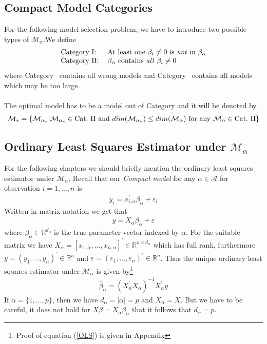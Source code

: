 \documentclass[Research_Module_ES.tex]{subfiles}
\begin{document}
\subsection{Compact Model Categories} \label{chapter_compact_model}
For the following model selection problem, we have to introduce two possible types of $\mathcal{M}_\alpha$.We define
\begin{align*}
\begin{tabular}{ll}
Category~\RM{1}:& At least one $\beta_i\neq 0$ is \textit{not} in $\beta_\alpha$\\
Category~\RM{2}:& $\beta_\alpha$ contains \textit{all} $\beta_i\neq 0$
\end{tabular}
\end{align*}
where Category~ contains all wrong models and Category~ contains all models which may be too large.\\\\
The optimal model has to be a model out of Category  and it will be denoted by
\begin{align*}
\mathcal{M}_\ast=\{\mathcal{M}_{\alpha_\ast}|\mathcal{M}_{\alpha_\ast}\in \text{Cat.~\RM{2}~and~} dim(\mathcal{M}_{\alpha_\ast})\leq dim(\mathcal{M}_{\alpha})\text{~for~any~}\mathcal{M}_{\alpha}\in \text{Cat.~\RM{2}} \}
\end{align*}

\subsection{Ordinary Least Squares Estimator under $\mathcal{M}_\alpha$}
For the following chapters we should briefly mention the ordinary least squares estimator under $\mathcal{M}_\alpha$. Recall that our \textit{Compact model} for any $\alpha\in\mathcal{A}$ for observation $i=1,...,n$ is
\begin{align*}
	y_i=x_{i,\alpha}^\prime\beta_\alpha+\varepsilon_i
\end{align*}
Written in matrix notation we get that
\begin{align}
	y=X_\alpha \beta_\alpha+\varepsilon  \label{CM_model_matrix}
\end{align}
where $\beta_\alpha\in\mathbb{R}^{d_\alpha}$ is the true parameter vector indexed by $\alpha$. For the suitable matrix we have $X_\alpha=[x_{1,\alpha},...,x_{n,\alpha}]^\prime \in\mathbb{R}^{n\times d_\alpha}$
which has full rank, furthermore $y=(y_1,...,y_n)^\prime\in\mathbb{R}^n$ and $\varepsilon=(\varepsilon_1,...,\varepsilon_n)^\prime\in\mathbb{R}^n$. Thus the unique 
ordinary least squares estimator under $\mathcal{M}_\alpha$ is given by\footnote{Proof of equation (\ref{OLS}) is given in Appendix }
\begin{align}
	\hat{\beta}_\alpha=(X_\alpha^\prime X_\alpha)^{-1}X_\alpha^\prime y
	\label{OLS}
\end{align}
If $\alpha=\{1,...,p\}$, then we have $d_\alpha=|\alpha|=p$ and $X_\alpha=X$. But we have to be careful, it does not hold for $X\beta=X_\alpha\beta_\alpha$ that it follows that $d_\alpha=p$.
\end{document}
